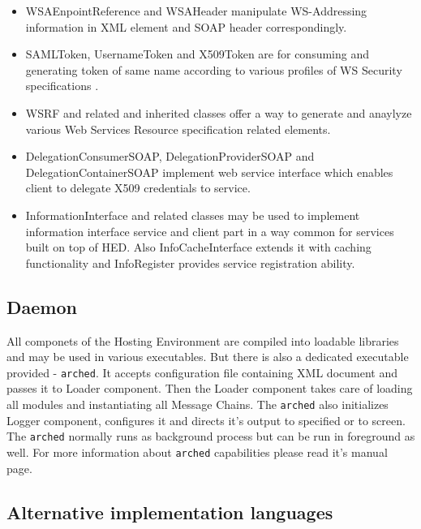 \documentclass{book}
\begin{document}
\begin{itemize}

\item WSAEnpointReference and WSAHeader manipulate WS-Addressing \cite{ws-addr-soap} information in XML element and SOAP header correspondingly.

\item SAMLToken, UsernameToken and X509Token are for consuming and generating token of same name according to various profiles of WS Security specifications \cite{ws-security}.

\item WSRF and related and inherited classes offer a way to generate and anaylyze various Web Services Resource specification \cite{wsrf} related elements.

\item DelegationConsumerSOAP, DelegationProviderSOAP and DelegationContainerSOAP implement web service interface which enables client to delegate X509 credentials to service.

\item InformationInterface and related classes may be used to implement information interface service and client part in a way common for services built on top of HED. Also InfoCacheInterface extends it with caching functionality and InfoRegister provides service registration ability.

\end{itemize}


\subsection{Daemon}

All componets of the Hosting Environment are compiled into loadable libraries and may be used in various executables. But there is also a dedicated executable provided - \texttt{arched}. It accepts configuration file containing XML document and passes it to Loader component. Then the Loader component takes care of loading all modules and instantiating all Message Chains. 
The \texttt{arched} also initializes Logger component, configures it and directs it's output to specified or to screen. The \texttt{arched} normally runs as background process but can be run in foreground as well. 
For more information about \texttt{arched} capabilities please read it's manual page.


\subsection{Alternative implementation languages}
\end{document}
